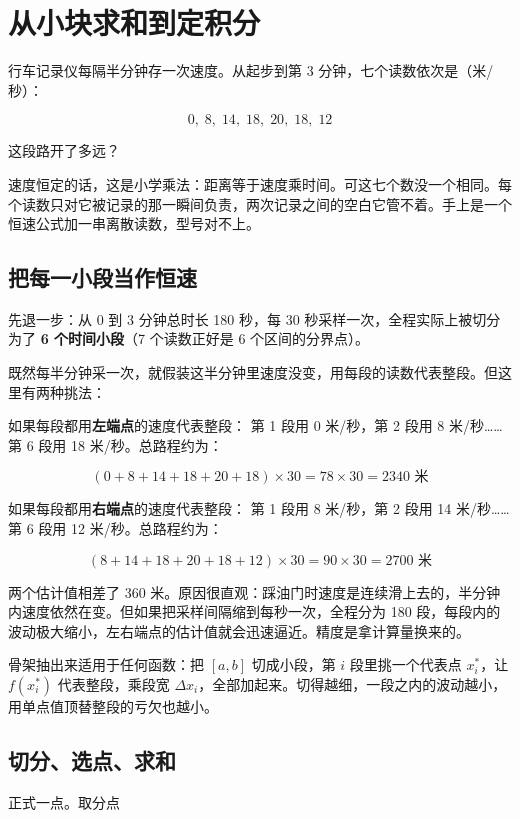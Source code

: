 \section{从小块求和到定积分}
\label{sec:02-Calculus/04-Integration/01}

行车记录仪每隔半分钟存一次速度。从起步到第 3 分钟，七个读数依次是（米/秒）：

\[
0,\;8,\;14,\;18,\;20,\;18,\;12
\]

这段路开了多远？

速度恒定的话，这是小学乘法：距离等于速度乘时间。可这七个数没一个相同。每个读数只对它被记录的那一瞬间负责，两次记录之间的空白它管不着。手上是一个恒速公式加一串离散读数，型号对不上。

\subsection{把每一小段当作恒速}

先退一步：从 0 到 3 分钟总时长 180 秒，每 30 秒采样一次，全程实际上被切分为了 \textbf{6 个时间小段}（7 个读数正好是 6 个区间的分界点）。

既然每半分钟采一次，就假装这半分钟里速度没变，用每段的读数代表整段。但这里有两种挑法：

如果每段都用\textbf{左端点}的速度代表整段：
第 1 段用 0 米/秒，第 2 段用 8 米/秒……第 6 段用 18 米/秒。总路程约为：


\[
(0+8+14+18+20+18)\times 30 = 78 \times 30 = 2340 \text{ 米}
\]

如果每段都用\textbf{右端点}的速度代表整段：
第 1 段用 8 米/秒，第 2 段用 14 米/秒……第 6 段用 12 米/秒。总路程约为：


\[
(8+14+18+20+18+12)\times 30 = 90 \times 30 = 2700 \text{ 米}
\]

两个估计值相差了 360 米。原因很直观：踩油门时速度是连续滑上去的，半分钟内速度依然在变。但如果把采样间隔缩到每秒一次，全程分为 180 段，每段内的波动极大缩小，左右端点的估计值就会迅速逼近。精度是拿计算量换来的。

骨架抽出来适用于任何函数：把 \([a,b]\) 切成小段，第 \(i\) 段里挑一个代表点 \(x_i^*\)，让 \(f(x_i^*)\) 代表整段，乘段宽 \(\Delta x_i\)，全部加起来。切得越细，一段之内的波动越小，用单点值顶替整段的亏欠也越小。

\subsection{切分、选点、求和}

正式一点。取分点

